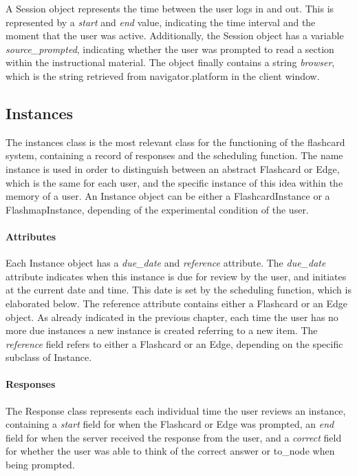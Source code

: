 A Session object represents the time between the user logs in and out. This is represented by a \emph{start} and \emph{end} value, indicating the time interval and the moment that the user was active. Additionally, the Session object has a variable \emph{source\_prompted}, indicating whether the user was prompted to read a section within the instructional material. The object finally contains a string \emph{browser}, which is the string retrieved from navigator.platform in the client window.

\subsection{Instances}

The instances class is the most relevant class for the functioning of the flashcard system, containing a record of responses and the scheduling function. The name instance is used in order to distinguish between an abstract Flashcard or Edge, which is the same for each user, and the specific instance of this idea within the memory of a user. An Instance object can be either a FlashcardInstance or a FlashmapInstance, depending of the experimental condition of the user.

\paragraph{Attributes} Each Instance object has a \emph{due\_date} and \emph{reference} attribute. The \emph{due\_date} attribute indicates when this instance is due for review by the user, and initiates at the current date and time. This date is set by the scheduling function, which is elaborated below. The reference attribute contains either a Flashcard or an Edge object. As already indicated in the previous chapter, each time the user has no more due instances a new instance is created referring to a new item. The \emph{reference} field refers to either a Flashcard or an Edge, depending on the specific subclass of Instance.

\paragraph{Responses} The Response class represents each individual time the user reviews an instance, containing a \emph{start} field for when the Flashcard or Edge was prompted, an \emph{end} field for when the server received the response from the user, and a \emph{correct} field for whether the user was able to think of the correct answer or to\_node when being prompted.

